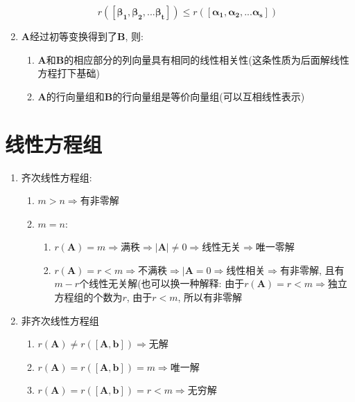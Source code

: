 \begin{enumerate}
\begin{equation*}
r([\bm{\beta_{1}},\bm{\beta_{2}},...\bm{\beta_{t}}])\le r([\bm{\alpha_{1}},\bm{\alpha_{2}},...\bm{\alpha_{s}}])
\end{equation*}
\item $\bm{A}$经过初等变换得到了$\bm{B}$, 则:
\begin{enumerate}
\item $\bm{A}$和$\bm{B}$的相应部分的列向量具有相同的线性相关性(这条性质为后面解线性方程打下基础)
\item $\bm{A}$的行向量组和$\bm{B}$的行向量组是等价向量组(可以互相线性表示)
\end{enumerate}
\end{enumerate}
\chapter{线性方程组}
\begin{enumerate}
\item 齐次线性方程组:
\begin{enumerate}
\item $m>n\Rightarrow $有非零解
\item $m=n$:
\begin{enumerate}
\item $r(\bm{A})=m\Rightarrow$满秩$\Rightarrow |\bm{A}|\neq 0 \Rightarrow$线性无关$\Rightarrow$唯一零解
\item $r(\bm{A})=r<m\Rightarrow$不满秩$\Rightarrow |\bm{A}=0\Rightarrow$线性相关$\Rightarrow$有非零解, 且有$m-r$个线性无关解(也可以换一种解释: 由于$r(\bm{A})=r<m\Rightarrow$独立方程组的个数为$r$, 由于$r<m$, 所以有非零解
\end{enumerate}
\end{enumerate}
\item 非齐次线性方程组
\begin{enumerate}
\item $r(\bm{A})\neq r([\bm{A},\bm{b}])\Rightarrow$无解
\item $r(\bm{A})=r([\bm{A},\bm{b}])=m\Rightarrow$唯一解
\item $r(\bm{A})=r([\bm{A},\bm{b}])=r<m\Rightarrow$无穷解
\end{enumerate}
\end{enumerate}
